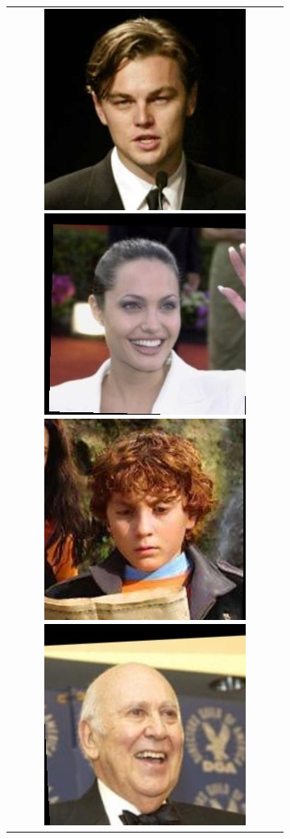 \documentclass[twoside,11pt]{article}
\begin{document}
\begin{figure}[H]
\begin{subfigure}[t]{0.3\textwidth}
\begin{tabular}{c}
          \includegraphics[scale=0.15]{Leonardo_DiCaprio_0001.jpg} \includegraphics[scale=0.15]{Angelina_Jolie_0001.jpg} \includegraphics[scale=0.15]{Daryl_Sabara_0001.jpg} \includegraphics[scale=0.15]{Carl_Reiner_0002.jpg} \\
\end{tabular}
    

\end{subfigure}
\end{figure}
\end{document}
